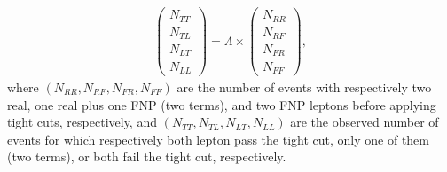 \begin{align}
\left(\begin{array}{c}
N_{TT} \\  N_{TL} \\ N_{LT} \\ N_{LL}
\end{array}\right) = 
\Lambda \times 
\left(\begin{array}{c}
N_{RR} \\  N_{RF} \\ N_{FR} \\ N_{FF}
\end{array}\right), 
\label{eq:mxm_start}
\end{align}
where $(N_{RR},N_{RF},N_{FR},N_{FF})$ are the number of events with respectively two real, one real plus one FNP (two terms), and two FNP leptons before applying tight cuts, respectively, and $(N_{TT},N_{TL},N_{LT},N_{LL})$ are the observed number of events for which respectively both lepton pass the tight cut, only one of them (two terms), or both fail the tight cut, respectively. 

